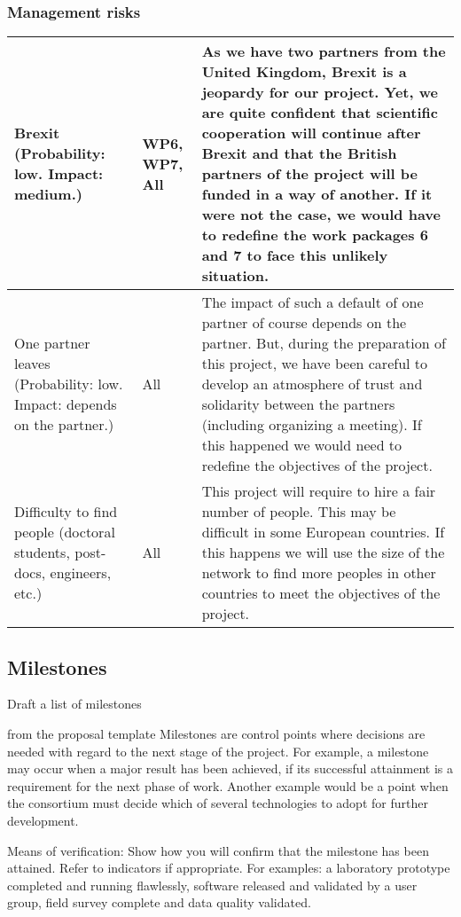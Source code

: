\subsubsection*{Management risks}


\begin{longtable}{|p{}|p{}|p{}|}
\hline
Brexit (Probability: low. Impact: medium.)
&
WP6, WP7, All
&
As we have two partners from the United Kingdom, Brexit is a jeopardy
for our project. Yet, we are quite confident that scientific
cooperation will continue after Brexit and that the British partners
of the project will be funded in a way of another. If it were not the
case, we would have to redefine the work packages 6 and 7 to face
this unlikely situation.
\\
\hline
One partner leaves (Probability: low. Impact: depends on the partner.)
&
All
&
The impact of such a default of one partner of course depends on the
partner. But, during the preparation of this project, we have been
careful to develop an atmosphere of trust and solidarity between the
partners (including organizing a meeting). If this happened
we would need to redefine the objectives of the project.
\\
\hline
Difficulty to find people (doctoral students, post-docs, engineers, etc.)
&
All
&
This project will require to hire a fair number of people. This may be
difficult in some European countries. If this happens we will use the
size of the network to find more peoples in other countries to meet
the objectives of the project.\\
\hline
\end{longtable}





{\subsection{Milestones}\label{sec:milestones}


\color{red} Draft a list of milestones}

\begin{todo}{from the proposal template}
  Milestones are control points where decisions are needed with regard to the next stage
  of the project. For example, a milestone may occur when a major result has been
  achieved, if its successful attainment is a requirement for the next phase of
  work. Another example would be a point when the consortium must decide which of several
  technologies to adopt for further development.

  Means of verification: Show how you will confirm that the milestone has been
  attained. Refer to indicators if appropriate. For examples: a laboratory prototype
  completed and running flawlessly, software released and validated by a user group, field
  survey complete and data quality validated.
\end{todo}

